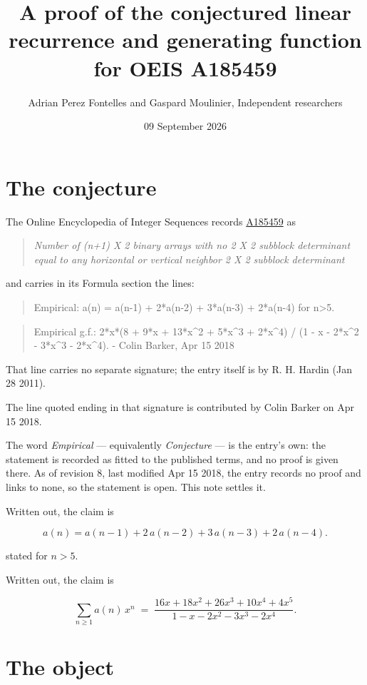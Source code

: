 \documentclass[11pt]{article}
\title{A proof of the conjectured linear recurrence and generating function for OEIS A185459}
\author{Adrian Perez Fontelles and Gaspard Moulinier, Independent researchers}
\date{09 September 2026}
\theoremstyle{definition}
\begin{document}
\maketitle
\section{The conjecture}

The Online Encyclopedia of Integer Sequences records \href{https://oeis.org/A185459}{A185459} as

\begin{quote}\itshape Number of (n+1) X 2 binary arrays with no 2 X 2 subblock determinant equal to any horizontal or vertical neighbor 2 X 2 subblock determinant\end{quote}

and carries in its Formula section the lines:

\begin{quote}\ttfamily Empirical: a(n) = a(n-1) + 2*a(n-2) + 3*a(n-3) + 2*a(n-4) for n>5.\end{quote}

\begin{quote}\ttfamily Empirical g.f.: 2*x*(8 + 9*x + 13*x\textasciicircum{}2 + 5*x\textasciicircum{}3 + 2*x\textasciicircum{}4) / (1 - x - 2*x\textasciicircum{}2 - 3*x\textasciicircum{}3 - 2*x\textasciicircum{}4). - Colin Barker, Apr 15 2018\end{quote}

That line carries no separate signature; the entry itself is by R. H. Hardin (Jan 28 2011).

The line quoted ending in that signature is contributed by Colin Barker on Apr 15 2018.

The word {\itshape Empirical} --- equivalently {\itshape Conjecture} --- is the entry's own: the statement is recorded as fitted to the published terms, and no proof is given there. As of revision 8, last modified Apr 15 2018, the entry records no proof and links to none, so the statement is open. This note settles it.

Written out, the claim is

\[a(n) = a(n-1) + 2\,a(n-2) + 3\,a(n-3) + 2\,a(n-4).\]

stated for $n > 5$.

Written out, the claim is

\[\sum_{n \ge 1} a(n)\,x^n \;=\; \frac{16x + 18x^{2} + 26x^{3} + 10x^{4} + 4x^{5}}{1 - x - 2x^{2} - 3x^{3} - 2x^{4}}.\]

\section{The object}
\end{document}
